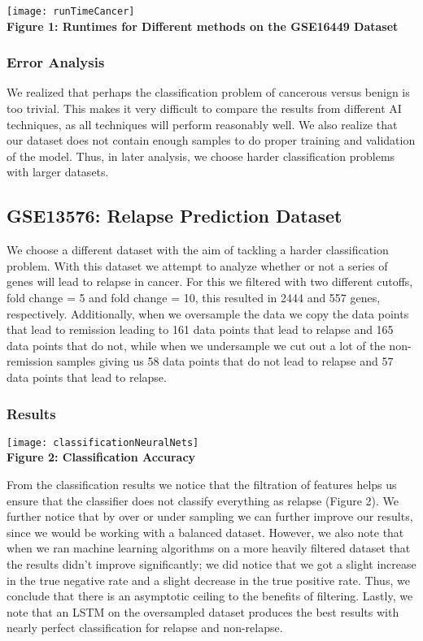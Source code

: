 \documentclass[12pt]{scrartcl}
\begin{document}
    \begin{center}
    \texttt{[image: runTimeCancer]}\\
    \textbf{Figure 1: Runtimes for Different methods on the GSE16449 Dataset}
    \end{center}
    
    \subsubsection{Error Analysis}
    We realized that perhaps the classification problem of cancerous versus benign is too trivial. This makes it very difficult to compare the results from different AI techniques, as all techniques will perform reasonably well. We also realize that our dataset does not contain enough samples to do proper training and validation of the model. Thus, in later analysis, we choose harder classification problems with larger datasets.
    
    \subsection{GSE13576: Relapse Prediction Dataset}
    We choose a different dataset with the aim of tackling a harder classification problem. With this dataset we attempt to analyze whether or not a series of genes will lead to relapse in cancer. For this we filtered with two different cutoffs, fold change = 5 and fold change = 10, this resulted in 2444 and 557 genes, respectively. Additionally, when we oversample the data we copy the data points that lead to remission leading to 161 data points that lead to relapse and 165 data points that do not, while when we undersample we cut out a lot of the non-remission samples giving us 58 data points that do not lead to relapse and 57 data points that lead to relapse. 
    
    \subsubsection{Results}    
    \begin{center}
    \texttt{[image: classificationNeuralNets]}\\
    \textbf{Figure 2: Classification Accuracy}
    \end{center}
   
    From the classification results we notice that the filtration of features helps us ensure that the classifier does not classify everything as relapse (Figure 2). We further notice that by over or under sampling we can further improve our results, since we would be working with a balanced dataset. However, we also note that when we ran machine learning algorithms on a more heavily filtered dataset that the results didn't improve significantly; we did notice that we got a slight increase in the true negative rate and a slight decrease in the true positive rate. Thus, we conclude that there is an asymptotic ceiling to the benefits of filtering. Lastly, we note that an LSTM on the oversampled dataset produces the best results with nearly perfect classification for relapse and non-relapse. 
    
\end{document}
